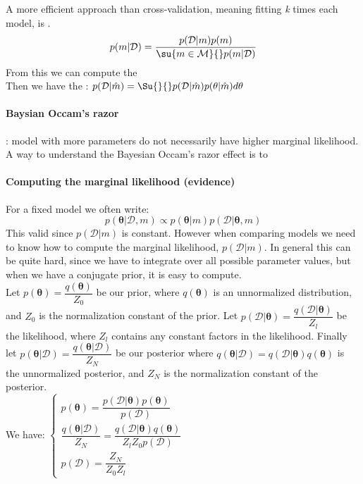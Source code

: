 A more efficient approach than cross-validation, meaning fitting \emph{k} times each
model, is .
$$
p(m|\mathcal{D}) = \dfrac{p(\mathcal{D}|m)p(m)}{\su{{m\in\mathcal{M}}}{}p(m|\mathcal{D})}
$$
From this we can compute the \\
Then we have the : $p(\mathcal{D}|\hat{m}) = \Su{}{}p(
\mathcal{D}|\hat{m})p(\theta|\hat{m})d\theta$

\paragraph{Baysian Occam's razor}
: model with more parameters do not necessarily have higher 
marginal likelihood.\\
A way to understand the Bayesian Occam's razor effect is to 

\paragraph{Computing the marginal likelihood (evidence)}
For a fixed model we often write:
$$p(\bm{\theta}|\mathcal{D},m) \propto p(\bm{\theta}|m)p(\mathcal{D}|\bm{\theta},m)$$
This valid since $p(\mathcal{D}|m)$ is constant. However when comparing models we need
to know how to compute the marginal likelihood, $p(\mathcal{D}|m)$. In general this can
be quite hard, since we have to integrate over all possible parameter values, but when
we have a conjugate prior, it is easy to compute.\\
Let $p(\bm{\theta})=\dfrac{q(\bm{\theta})}{Z_{0}}$ be our prior, where $q(\bm{\theta})$
is an unnormalized distribution, and $Z_{0}$ is the normalization constant of the prior.
Let $p(\mathcal{D}|\bm{\theta})=\dfrac{q(\mathcal{D}|\bm{\theta})}{Z_{l}}$ be the 
likelihood, where $Z_{l}$ contains any constant factors in the likelihood. Finally let
$p(\bm{\theta}|\mathcal{D})=\dfrac{q(\bm{\theta}|\mathcal{D})}{Z_{N}}$ be our posterior
where $q(\bm{\theta}|\mathcal{D})=q(\mathcal{D}|\bm{\theta})q(\bm{\theta})$ is the 
unnormalized posterior, and $Z_{N}$ is the normalization constant of the posterior.\\
We have:
$
\begin{cases}
	p(\bm{\theta})= \dfrac{p(\mathcal{D}|\bm{\theta})p(\bm{\theta})}{p(\mathcal{D})}\\
	\dfrac{q(\bm{\theta}|\mathcal{D})}{Z_{N}} = \dfrac{q(\mathcal{D}|\bm{\theta})
	q(\bm{\theta})}{Z_{l}Z_{0}p(\mathcal{D})}\\
	p(\mathcal{D}) = \dfrac{Z_{N}}{Z_{0}Z_{l}}
\end{cases}
$

